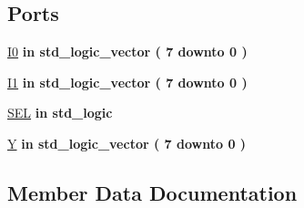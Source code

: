 \subsection*{Ports}
 \begin{DoxyCompactItemize}
\item 
\hyperlink{classmux__2__1_aa65cf3a40575024bb2de3a9bbb72c130}{I0}  {\bfseries {\bfseries \textcolor{keywordflow}{in}\textcolor{vhdlchar}{ }}} {\bfseries \textcolor{comment}{std\+\_\+logic\+\_\+vector}\textcolor{vhdlchar}{ }\textcolor{vhdlchar}{(}\textcolor{vhdlchar}{ }\textcolor{vhdlchar}{ } \textcolor{vhdldigit}{7} \textcolor{vhdlchar}{ }\textcolor{keywordflow}{downto}\textcolor{vhdlchar}{ }\textcolor{vhdlchar}{ } \textcolor{vhdldigit}{0} \textcolor{vhdlchar}{ }\textcolor{vhdlchar}{)}\textcolor{vhdlchar}{ }} 
\item 
\hyperlink{classmux__2__1_a96f2c41f30fdb05e9ca12bd6c2e39324}{I1}  {\bfseries {\bfseries \textcolor{keywordflow}{in}\textcolor{vhdlchar}{ }}} {\bfseries \textcolor{comment}{std\+\_\+logic\+\_\+vector}\textcolor{vhdlchar}{ }\textcolor{vhdlchar}{(}\textcolor{vhdlchar}{ }\textcolor{vhdlchar}{ } \textcolor{vhdldigit}{7} \textcolor{vhdlchar}{ }\textcolor{keywordflow}{downto}\textcolor{vhdlchar}{ }\textcolor{vhdlchar}{ } \textcolor{vhdldigit}{0} \textcolor{vhdlchar}{ }\textcolor{vhdlchar}{)}\textcolor{vhdlchar}{ }} 
\item 
\hyperlink{classmux__2__1_ade645ba51bce7e64d8a3e94a80d11476}{S\+E\+L}  {\bfseries {\bfseries \textcolor{keywordflow}{in}\textcolor{vhdlchar}{ }}} {\bfseries \textcolor{comment}{std\+\_\+logic}\textcolor{vhdlchar}{ }} 
\item 
\hyperlink{classmux__2__1_a212cdb12afa7733d9b463921b2c4ec79}{Y}  {\bfseries {\bfseries \textcolor{keywordflow}{in}\textcolor{vhdlchar}{ }}} {\bfseries \textcolor{comment}{std\+\_\+logic\+\_\+vector}\textcolor{vhdlchar}{ }\textcolor{vhdlchar}{(}\textcolor{vhdlchar}{ }\textcolor{vhdlchar}{ } \textcolor{vhdldigit}{7} \textcolor{vhdlchar}{ }\textcolor{keywordflow}{downto}\textcolor{vhdlchar}{ }\textcolor{vhdlchar}{ } \textcolor{vhdldigit}{0} \textcolor{vhdlchar}{ }\textcolor{vhdlchar}{)}\textcolor{vhdlchar}{ }} 
\end{DoxyCompactItemize}


\subsection{Member Data Documentation}
\hypertarget{classmux__2__1_aa65cf3a40575024bb2de3a9bbb72c130}{}
